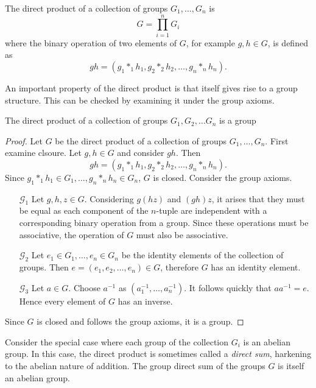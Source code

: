 \documentclass[../notes.tex]{subfiles}
\begin{document}
\begin{definition}
	The direct product of a collection of groups $G_1, \ldots, G_n$ is
	\[
		G = \prod_{i=1}^n G_i
	\]
	where the binary operation of two elements of $G$, for example $g,h \in G$, is defined as
	\[
		gh = (g_1 *_1 h_1, g_2 *_2 h_2, \ldots, g_n *_n h_n)
	.\]
\end{definition}
An important property of the direct product is that itself gives rise to a group structure. This can be checked by examining it under the group axioms.

\begin{theorem}
	The direct product of a collection of groups $G_1, G_2, \ldots G_n$ is a group
\end{theorem}
\begin{proof}
	Let $G$ be the direct product of a collection of groups $G_1, \ldots, G_n$. First examine clsoure. Let $g,h \in G$ and consider $gh$. Then
	\[
		gh = (g_1 *_1 h_1, g_2 *_2 h_2, \ldots, g_n *_n h_n)
	.\]
	Since $g_1 *_1 h_1 \in G_1, \ldots, g_n *_n h_n \in G_n$, $G$ is closed. Consider the group axioms.
	\begin{enumerate}
	\item[$\mathcal{G}_1$]
		Let $g,h,z \in G$. Considering $g(hz)$ and $(gh)z$, it arises that they must be equal as each component of the $n$-tuple are independent with a corresponding binary operation from a group. Since these operations must be associative, the operation of $G$ must also be associative.
	\item[$\mathcal{G}_2$]
		Let $e_1 \in G_1, \ldots, e_n \in G_n$ be the identity elements of the collection of groups. Then $e = (e_1, e_2, \ldots, e_n) \in G$, therefore $G$ has an identity element.
	\item[$\mathcal{G}_3$]
		Let $a \in G$. Choose $a^{-1}$ as $(a_1^{-1}, \ldots, a_n^{-1})$. It follows quickly that $aa^{-1} = e$. Hence every element of $G$ has an inverse.
	\end{enumerate}
	Since $G$ is closed and follows the group axioms, it is a group.
\end{proof}

Consider the special case where each group of the collection $G_i$ is an abelian group. In this case, the direct product is sometimes called a \textit{direct sum}, harkening to the abelian nature of addition. The group direct sum of the groups $G$ is itself an abelian group. %
\end{document}
